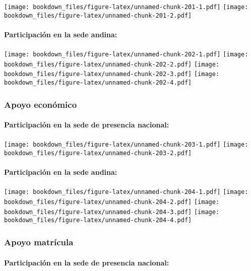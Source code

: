 \documentclass[]{article}
\let\oldparagraph\paragraph
\renewcommand{\paragraph}[1]{\oldparagraph{#1}\mbox{}}
\theoremstyle{definition}
\theoremstyle{definition}
\theoremstyle{definition}
\theoremstyle{remark}
\begin{document}
\texttt{[image: bookdown\_files/figure-latex/unnamed-chunk-201-1.pdf]}
\texttt{[image: bookdown\_files/figure-latex/unnamed-chunk-201-2.pdf]}

\paragraph{Participación en la sede
andina:}\label{participacion-en-la-sede-andina-13}

\texttt{[image: bookdown\_files/figure-latex/unnamed-chunk-202-1.pdf]}
\texttt{[image: bookdown\_files/figure-latex/unnamed-chunk-202-2.pdf]}
\texttt{[image: bookdown\_files/figure-latex/unnamed-chunk-202-3.pdf]}
\texttt{[image: bookdown\_files/figure-latex/unnamed-chunk-202-4.pdf]}

\subsubsection{Apoyo económico}\label{apoyo-economico-1}

\paragraph{Participación en la sede de presencia
nacional:}\label{participacion-en-la-sede-de-presencia-nacional-14}

\texttt{[image: bookdown\_files/figure-latex/unnamed-chunk-203-1.pdf]}
\texttt{[image: bookdown\_files/figure-latex/unnamed-chunk-203-2.pdf]}

\paragraph{Participación en la sede
andina:}\label{participacion-en-la-sede-andina-14}

\texttt{[image: bookdown\_files/figure-latex/unnamed-chunk-204-1.pdf]}
\texttt{[image: bookdown\_files/figure-latex/unnamed-chunk-204-2.pdf]}
\texttt{[image: bookdown\_files/figure-latex/unnamed-chunk-204-3.pdf]}
\texttt{[image: bookdown\_files/figure-latex/unnamed-chunk-204-4.pdf]}

\subsubsection{Apoyo matrícula}\label{apoyo-matricula-1}

\paragraph{Participación en la sede de presencia
nacional:}\label{participacion-en-la-sede-de-presencia-nacional-15}
\end{document}
